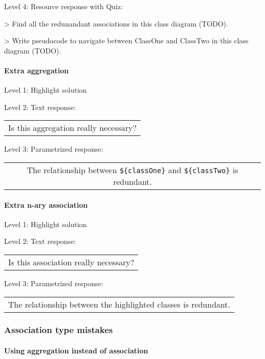 \noindent Level 4: Resource response with Quiz:

> Find all the redunandant associations in this class diagram (TODO).

> Write pseudocode to navigate between ClassOne and ClassTwo in this class diagram (TODO).


\paragraph{Extra aggregation}

\noindent Level 1: Highlight solution \medskip

\noindent Level 2: Text response: \medskip

\begin{tabular}{|c}
Is this aggregation really necessary?
\end{tabular} \medskip

\noindent Level 3: Parametrized response: \medskip

\begin{tabular}{|c}
The relationship between \verb|${classOne}| and \verb|${classTwo}| is redundant.
\end{tabular} \medskip


\paragraph{Extra n-ary association}

\noindent Level 1: Highlight solution \medskip

\noindent Level 2: Text response: \medskip

\begin{tabular}{|c}
Is this association really necessary?
\end{tabular} \medskip

\noindent Level 3: Parametrized response: \medskip

\begin{tabular}{|c}
The relationship between the highlighted classes is redundant.
\end{tabular} \medskip


\subsubsection{Association type mistakes}

\paragraph{Using aggregation instead of association}

